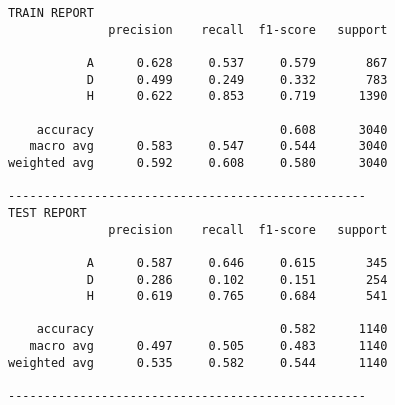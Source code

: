 \begin{lstlisting}[style=report]
TRAIN REPORT
              precision    recall  f1-score   support

           A      0.628     0.537     0.579       867
           D      0.499     0.249     0.332       783
           H      0.622     0.853     0.719      1390

    accuracy                          0.608      3040
   macro avg      0.583     0.547     0.544      3040
weighted avg      0.592     0.608     0.580      3040

--------------------------------------------------
TEST REPORT
              precision    recall  f1-score   support

           A      0.587     0.646     0.615       345
           D      0.286     0.102     0.151       254
           H      0.619     0.765     0.684       541

    accuracy                          0.582      1140
   macro avg      0.497     0.505     0.483      1140
weighted avg      0.535     0.582     0.544      1140

--------------------------------------------------  
\end{lstlisting}
